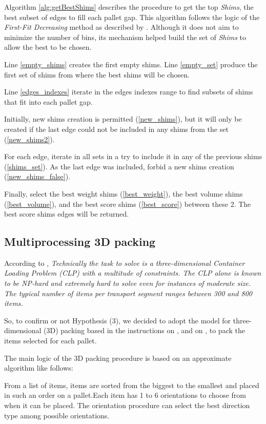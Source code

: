 \documentclass[preprint,authoryear]{elsarticle}
\begin{document}
Algorithm \ref{alg:getBestShims} describes the procedure to get the top {\it Shims}, the best subset of edges to fill each pallet gap. This algorithm follows the logic of the {\it First-Fit Decreasing} method as described by \cite{JohnsonGarey1985}. Although it does not aim to minimize the number of bins, its mechanism helped build the set of {\it Shims} to allow the best to be chosen.

Line \ref{empty_shims} creates the first empty shims.
Line \ref{empty_set} produce the first set of shims from where the best shims will be chosen.

Line \ref{edges_indexes} iterate in the edges indexes range to find subsets of shims that fit into each pallet gap.

Initially, new shims creation is permitted (\ref{new_shims}), but it will only be created if the last edge could not be included in any shims from the set (\ref{new_shims2}). 

For each edge, iterate in all sets in a try to include it in any of the previous shims (\ref{shims_set}).
As the last edge was included, forbid a new shims creation (\ref{new_shims_false}).

Finally, select the best weight shims (\ref{best_weight}), the best volume shims (\ref{best_volume}), and the best score shims (\ref{best_score}) between these 2. The best score shims edges will be returned.


\subsection{Multiprocessing 3D packing}

According to \cite{BrandtStefan2019}, {\it Technically the task to solve is a three-dimensional Container Loading Problem (CLP) with a multitude of constraints. The CLP alone is known to be NP-hard and extremely hard to solve even for instances of moderate size. The typical number of items per transport segment ranges between 300 and 800 items.}

So, to confirm or not Hypothesis (3), we decided to adopt the model for three-dimensional (3D) packing based in the instructions on \cite{DubeKanavathy2006}, \cite{li2014} and on \cite{PaquayLimbourgSchynsOliveira2018}, to pack the items selected for each pallet.

The main logic of the 3D packing procedure is based on an approximate algorithm like follows:

From a list of items, items are sorted from the biggest to the smallest and placed in such an order on a pallet.Each item has 1 to 6 orientations to choose from when it can be placed. The orientation procedure can select the best direction type among possible orientations.
\end{document}
